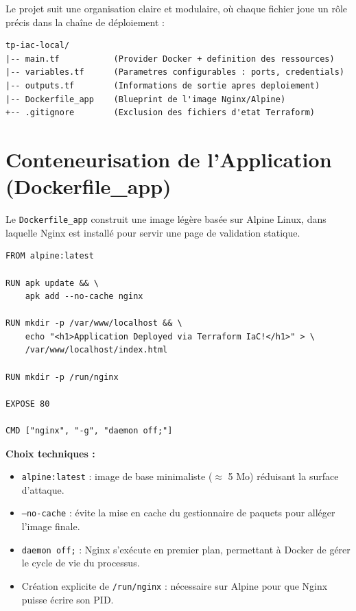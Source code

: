\documentclass[12pt,a4paper]{report}
\begin{document}
Le projet suit une organisation claire et modulaire, où chaque fichier joue un rôle précis
dans la chaîne de déploiement :

\begin{mdframed}[backgroundcolor=backcolour, linecolor=bordercolor]
\begin{verbatim}
tp-iac-local/
|-- main.tf           (Provider Docker + definition des ressources)
|-- variables.tf      (Parametres configurables : ports, credentials)
|-- outputs.tf        (Informations de sortie apres deploiement)
|-- Dockerfile_app    (Blueprint de l'image Nginx/Alpine)
+-- .gitignore        (Exclusion des fichiers d'etat Terraform)
\end{verbatim}
\end{mdframed}

\section{Conteneurisation de l'Application (Dockerfile\_app)}

Le \texttt{Dockerfile\_app} construit une image légère basée sur Alpine Linux,
dans laquelle Nginx est installé pour servir une page de validation statique.

\begin{lstlisting}[style=dockerfile, caption={Dockerfile\_app --- Image Nginx/Alpine}]
FROM alpine:latest

RUN apk update && \
    apk add --no-cache nginx

RUN mkdir -p /var/www/localhost && \
    echo "<h1>Application Deployed via Terraform IaC!</h1>" > \
    /var/www/localhost/index.html

RUN mkdir -p /run/nginx

EXPOSE 80

CMD ["nginx", "-g", "daemon off;"]
\end{lstlisting}

\textbf{Choix techniques :}
\begin{itemize}
  \item \texttt{alpine:latest} : image de base minimaliste ($\approx$ 5 Mo) réduisant la surface d'attaque.
  \item \texttt{--no-cache} : évite la mise en cache du gestionnaire de paquets pour alléger l'image finale.
  \item \texttt{daemon off;} : Nginx s'exécute en premier plan, permettant à Docker de gérer le cycle de vie du processus.
  \item Création explicite de \texttt{/run/nginx} : nécessaire sur Alpine pour que Nginx puisse écrire son PID.
\end{itemize}
\end{document}
